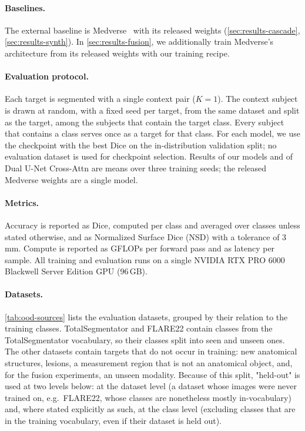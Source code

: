 \documentclass[hidelinks, a4paper, 12pt, ngerman, english]{article}  %
\begin{document}
\paragraph{Baselines.}
The external baseline is Medverse~\cite{huMedverseUniversalModel2025a} with
its released weights (\autoref{sec:results-cascade},
\autoref{sec:results-synth}). In \autoref{sec:results-fusion}, we additionally
train Medverse's architecture from its released weights with our training
recipe.


\paragraph{Evaluation protocol.}
Each target is segmented with a single context pair ($K = 1$). The context
subject is drawn at random, with a fixed seed per target, from the same dataset
and split as the target, among the subjects that contain the target class.
Every subject that contains a class serves once as a target for that class. For each model, we use the checkpoint with the best
Dice on the in-distribution validation split; no evaluation dataset is used for
checkpoint selection. Results of our models and of Dual U-Net Cross-Attn are means over three
training seeds; the released Medverse weights are a single model.

\paragraph{Metrics.}
Accuracy is reported as Dice, computed per class and averaged over classes
unless stated otherwise, and as Normalized Surface Dice (NSD) with a tolerance
of 3\,mm. Compute is reported as GFLOPs per forward pass and as latency per
sample. All training and evaluation runs on a single NVIDIA
RTX PRO 6000 Blackwell Server Edition GPU (96\,GB).


\paragraph{Datasets.}
\autoref{tab:ood-sources} lists the evaluation datasets, grouped by their
relation to the training classes. TotalSegmentator and FLARE22 contain classes
from the TotalSegmentator vocabulary, so their classes split into seen and
unseen ones. The other datasets contain targets that do not occur in training:
new anatomical structures, lesions, a measurement region that is not an
anatomical object, and, for the fusion experiments, an unseen modality.
Because of this split, "held-out" is used at two levels below: at the
dataset level (a dataset whose images were never trained on, e.g.\ FLARE22,
whose classes are nonetheless mostly in-vocabulary) and, where stated
explicitly as such, at the class level (excluding classes that are in the
training vocabulary, even if their dataset is held out).
\end{document}
